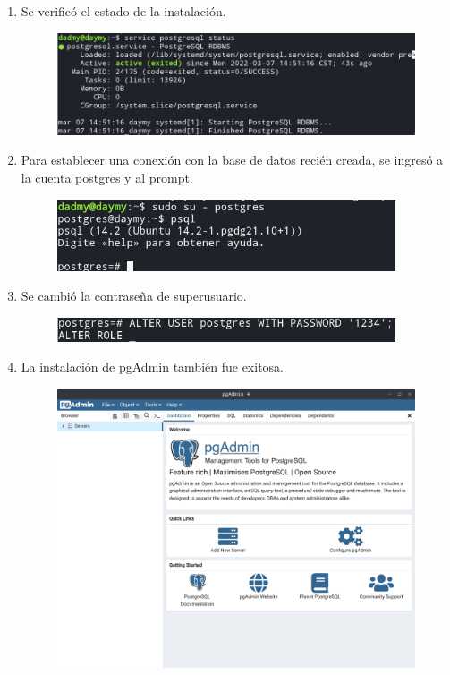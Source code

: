 \documentclass{exam}
\begin{document}
\begin{enumerate}
\newpage
\item Se verificó el estado de la instalación.
\begin{figure}[h]
	\centering
    \includegraphics[width = 15cm]{imgNolasco/14.png}
\end{figure}


\item Para establecer una conexión con la base de datos recién creada, se ingresó a la cuenta postgres y al prompt.

\begin{figure}[h]
	\centering
    \includegraphics[width = 10cm]{imgNolasco/15.png}
\end{figure}

\item Se cambió la contraseña de superusuario.
\begin{figure}[h]
	\centering
    \includegraphics[width = 10cm]{imgNolasco/16.png}
\end{figure}


\newpage
\item La instalación de pgAdmin también fue exitosa.
\begin{figure}[h]
	\centering
    \includegraphics[width = 15cm]{imgNolasco/17.png}
\end{figure}

\end{enumerate}
\end{document}
